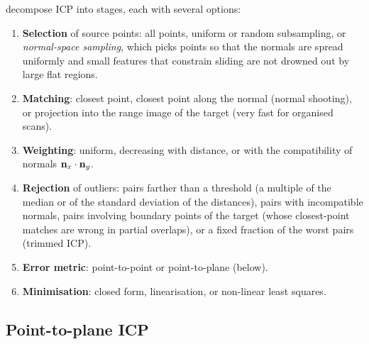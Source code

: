  decompose ICP into stages, each with several options:
\begin{enumerate}
  \item \textbf{Selection} of source points: all points, uniform or random subsampling, or
  \emph{normal-space sampling}, which picks points so that the normals are spread uniformly and
  small features that constrain sliding are not drowned out by large flat regions.
  \item \textbf{Matching}: closest point, closest point along the normal (normal shooting), or
  projection into the range image of the target (very fast for organised scans).
  \item \textbf{Weighting}: uniform, decreasing with distance, or with the compatibility of normals
  $\mathbf{n}_x\cdot\mathbf{n}_y$.
  \item \textbf{Rejection} of outliers: pairs farther than a threshold (a multiple of the median or
  of the standard deviation of the distances), pairs with incompatible normals, pairs involving
  boundary points of the target (whose closest-point matches are wrong in partial overlaps), or a
  fixed fraction of the worst pairs (trimmed ICP).
  \item \textbf{Error metric}: point-to-point or point-to-plane (below).
  \item \textbf{Minimisation}: closed form, linearisation, or non-linear least squares.
\end{enumerate}

\subsection{Point-to-plane ICP}

